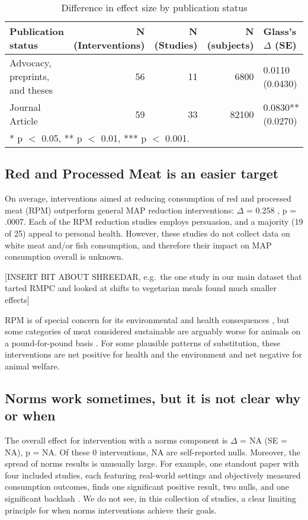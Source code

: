 \documentclass[sn-nature,pdflatex]{sn-jnl}
\begin{document}
\begin{table}[!h]
\centering
\caption{\label{tab:table_three}Difference in effect size by publication status}
\centering
\begin{tabular}[t]{lrrrl}
\toprule
Publication status & N (Interventions) & N (Studies) & N (subjects) & Glass's $\Delta$ (SE)\\
\midrule
Advocacy, preprints, and theses & 56 & 11 & 6800 & 0.0110 (0.0430)\\
Journal Article & 59 & 33 & 82100 & 0.0830** (0.0270)\\
\bottomrule
\multicolumn{5}{l}{\rule{0pt}{1em}* p $<$ 0.05, ** p $<$ 0.01, *** p $<$ 0.001.}\\
\end{tabular}
\end{table}

\subsection{Red and Processed Meat is an easier target}\label{sec2.3}

On average, interventions aimed at reducing consumption of red and
processed meat (RPM) outperform general MAP reduction interventions:
\(\Delta\) = 0.258 , p = .0007. Each of the RPM
reduction studies employs persuasion, and a majority (19 of 25) appeal
to personal health. However, these studies do not collect data on white
meat and/or fish consumption, and therefore their impact on MAP
consumption overall is unknown.

{[}INSERT BIT ABOUT SHREEDAR, e.g.~the one study in our main dataset
that tarted RMPC and looked at shifts to vegetarian meals found much
smaller effects{]}

RPM is of special concern for its environmental and health consequences
\citep{grummon2023}, but some categories of meat considered sustainable
are arguably worse for animals on a pound-for-pound basis
\citep{mathur2022ethical}. For some plausible patterns of substitution,
these interventions are net positive for health and the environment and
net negative for animal welfare.

\subsection{Norms work sometimes, but it is not clear why or
when}\label{sec2.4}

The overall effect for intervention with a norms component is \(\Delta\)
= NA (SE = NA), p = NA. Of these 0 interventions, NA are self-reported
nulls. Moreover, the spread of norms results is unusually large. For
example, one standout paper with four included studies, each featuring
real-world settings and objectively measured consumption outcomes, finds
one significant positive result, two nulls, and one significant backlash
\citep{sparkman2020}. We do not see, in this collection of studies, a
clear limiting principle for when norms interventions achieve their
goals.
\end{document}
